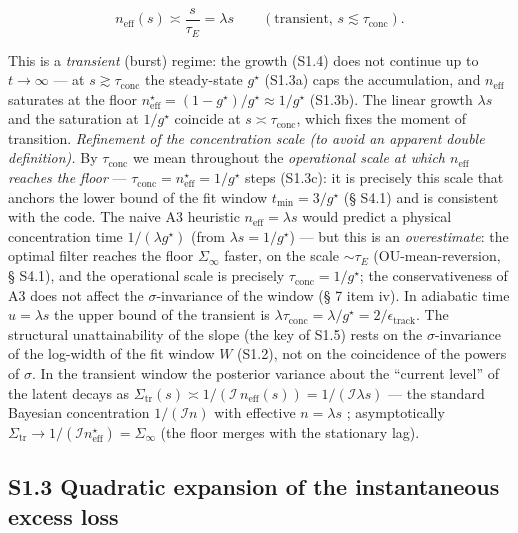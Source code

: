 \documentclass[12pt]{iopart}
\begin{document}
\begin{equation}n_{\text{eff}}(s) \asymp \frac{s}{\tau_E} = \lambda s \qquad (\text{transient, } s \lesssim \tau_{\text{conc}}). \tag{S1.4}\end{equation}



This is a \emph{transient} (burst) regime: the growth (S1.4) does not continue up to \(t\to\infty\) --- at \(s \gtrsim \tau_{\text{conc}}\) the steady-state \(g^\star\) (S1.3a) caps the accumulation, and \(n_{\text{eff}}\) saturates at the floor \(n_{\text{eff}}^\star = (1-g^\star)/g^\star \approx 1/g^\star\) (S1.3b). The linear growth \(\lambda s\) and the saturation at \(1/g^\star\) coincide at \(s \asymp \tau_{\text{conc}}\), which fixes the moment of transition. \emph{Refinement of the concentration scale (to avoid an apparent double definition).} By \(\tau_{\text{conc}}\) we mean throughout the \emph{operational scale at which \(n_{\text{eff}}\) reaches the floor} --- \(\tau_{\text{conc}} = n_{\text{eff}}^\star = 1/g^\star\) steps (S1.3c): it is precisely this scale that anchors the lower bound of the fit window \(t_{\min} = 3/g^\star\) (§ S4.1) and is consistent with the code. The naive A3 heuristic \(n_{\text{eff}} = \lambda s\) would predict a physical concentration time \(1/(\lambda g^\star)\) (from \(\lambda s = 1/g^\star\)) --- but this is an \emph{overestimate}: the optimal filter reaches the floor \(\Sigma_\infty\) faster, on the scale \(\sim\tau_E\) (OU-mean-reversion, § S4.1), and the operational scale is precisely \(\tau_{\text{conc}} = 1/g^\star\); the conservativeness of A3 does not affect the \(\sigma\)-invariance of the window (§ 7 item iv). In adiabatic time \(u = \lambda s\) the upper bound of the transient is \(\lambda\tau_{\text{conc}} = \lambda/g^\star = 2/\epsilon_{\text{track}}\). The structural unattainability of the slope (the key of S1.5) rests on the \(\sigma\)-invariance of the log-width of the fit window \(W\) (S1.2), not on the coincidence of the powers of \(\sigma\). In the transient window the posterior variance about the ``current level'' of the latent decays as \(\Sigma_{\text{tr}}(s) \asymp 1/(\mathcal I\,n_{\text{eff}}(s)) = 1/(\mathcal I\lambda s)\) --- the standard Bayesian concentration \(1/(\mathcal I n)\) with effective \(n = \lambda s\) \cite{ClarkeBarron1990}; asymptotically \(\Sigma_{\text{tr}} \to 1/(\mathcal I n_{\text{eff}}^\star) = \Sigma_\infty\) (the floor merges with the stationary lag).



\subsection{S1.3 Quadratic expansion of the instantaneous excess loss}\label{s1.3-quadratic-expansion-of-the-instantaneous-excess-loss}
\end{document}
